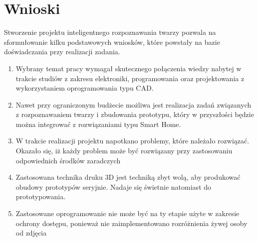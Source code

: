 \documentclass[a4paper,12pt,reqno]{article}
\begin{document}
\newpage
\section{Wnioski} \label{section:wnioski}
Stworzenie projektu inteligentnego rozpoznawania twarzy pozwala na sformułowanie kilku podstawowych wniosków, które powstały na bazie doświadczania przy realizacji zadania.

\begin{enumerate}
\item Wybrany temat pracy wymagał skutecznego połączenia wiedzy nabytej w trakcie studiów z zakresu elektroniki, programowania oraz projektowania z wykorzystaniem oprogramowania typu CAD.
\item Nawet przy ograniczonym budżecie możliwa jest realizacja zadań związanych z rozpoznawaniem twarzy i zbudowania prototypu, który w przyszłości będzie można integrować z rozwiązaniami typu Smart Home.
\item W trakcie realizacji projektu napotkano problemy, które należało rozwiązać. Okazało się, iż każdy problem może być rozwiązany przy zastosowaniu odpowiednich środków zaradczych
\item Zastosowana technika druku 3D jest techniką zbyt wolą, aby produkować obudowy prototypów seryjnie. Nadaje się świetnie natomiast do prototypowania.
\item Zastosowane oprogramowanie nie może być na ty etapie użyte w zakresie ochrony dostępu, ponieważ nie zaimplementowano rozróżnienia żywej osoby od zdjęcia
\end{enumerate}

\newpage



\end{document}
